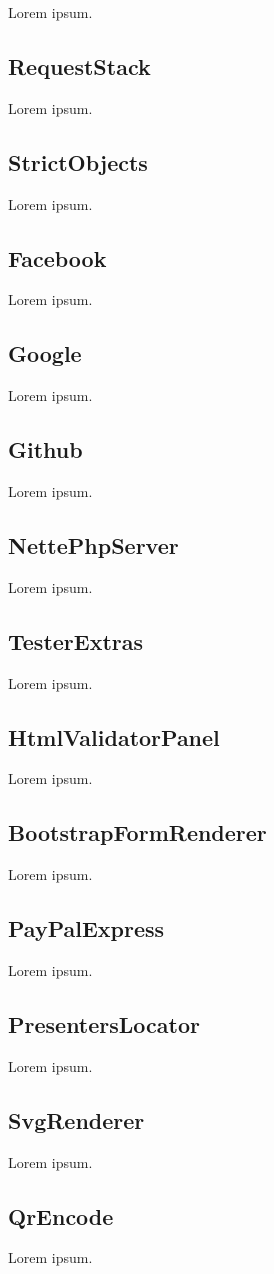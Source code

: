 Lorem ipsum.

\subsection{RequestStack}

Lorem ipsum.

\subsection{StrictObjects}

Lorem ipsum.

\subsection{Facebook}

Lorem ipsum.

\subsection{Google}

Lorem ipsum.

\subsection{Github}

Lorem ipsum.

\subsection{NettePhpServer}

Lorem ipsum.

\subsection{TesterExtras}

Lorem ipsum.

\subsection{HtmlValidatorPanel}

Lorem ipsum.

\subsection{BootstrapFormRenderer}

Lorem ipsum.

\subsection{PayPalExpress}

Lorem ipsum.

\subsection{PresentersLocator}

Lorem ipsum.

\subsection{SvgRenderer}

Lorem ipsum.

\subsection{QrEncode}

Lorem ipsum.